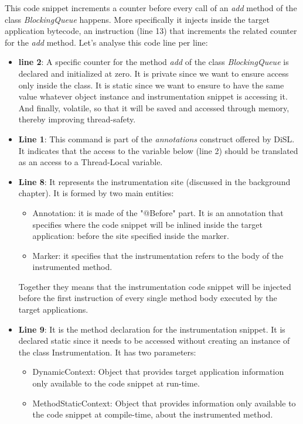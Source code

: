 \documentclass[]{usiinfthesis}
\begin{document}
\noindent
This code snippet increments a counter before every call of an \textit{add} method of the class \textit{BlockingQueue} happens. More specifically it injects inside the target application bytecode, an instruction (line 13) that increments the related counter for the \textit{add} method. Let's analyse this code line per line:

\begin{itemize}
    \item \textbf{line 2}: A specific counter for the method \textit{add} of the class \textit{BlockingQueue} is declared and initialized at zero. It is private since we want to ensure access only inside the class. It is static since we want to ensure to have the same value whatever object instance and instrumentation snippet is accessing it. And finally, volatile, so that it will be saved and accessed through memory, thereby improving thread-safety. 
    
    \item \textbf{Line 1}: This command is part of the \textit{annotations} construct offered by DiSL. It indicates that the access to the variable below (line 2) should be translated as an access to a Thread-Local variable.
    
    \item \textbf{Line 8}: It represents the instrumentation site (discussed in the background chapter). It is formed by two main entities:
    \begin{itemize}
        \item Annotation: it is made of the "@Before" part. It is an annotation that specifies where the code snippet will be inlined inside the target application: before the site specified inside the marker.
        \item Marker: it specifies that the instrumentation refers to the body of the instrumented method.
    \end{itemize}
    Together they means that the instrumentation code snippet will be injected before the first instruction of every single method body executed by the target applications.
    
    \item \textbf{Line 9}: It is the method declaration for the instrumentation snippet. It is declared static since it needs to be accessed without creating an instance of the class Instrumentation. It has two parameters:
    \begin{itemize}
        \item DynamicContext: Object that provides target application information only available to the code snippet at run-time.
        \item MethodStaticContext: Object that provides information only available to the code snippet at compile-time, about the instrumented method.
    \end{itemize}
    

\end{itemize}
\end{document}
